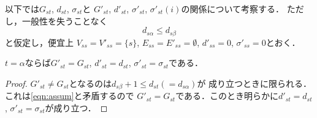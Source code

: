 以下では$G_{st}$, $d_{st}$, $\sigma_{st}$と
$G'_{st}$, $d'_{st}$, $\sigma'_{st}$, $\sigma'_{st}(i)$の関係について考察する．
ただし，一般性を失うことなく
\begin{equation}
d_{s\alpha} \leq d_{s\beta}
\label{eqn:assum}
\end{equation}
と仮定し，便宜上
$V_{ss}=V'_{ss}=\{s\}$, $E_{ss}=E'_{ss}=\emptyset$, $d'_{ss}=0$, 
$\sigma'_{ss}=0$とおく．

\begin{lemma}
$t=\alpha$ならば$G'_{st}=G_{st}$, $d'_{st}=d_{st}$, 
$\sigma'_{st}=\sigma_{st}$である．
\label{lemma:5}
\end{lemma}
\begin{proof}
$G'_{st} \neq G_{st}$となるのは$d_{s\beta}+1 \leq d_{st}(=d_{s\alpha})$が
成り立つときに限られる．これは\eqref{eqn:assum}と矛盾するので
$G'_{st}=G_{st}$である．このとき明らかに$d'_{st}=d_{st}$, 
$\sigma'_{st}=\sigma_{st}$が成り立つ．
\end{proof}


